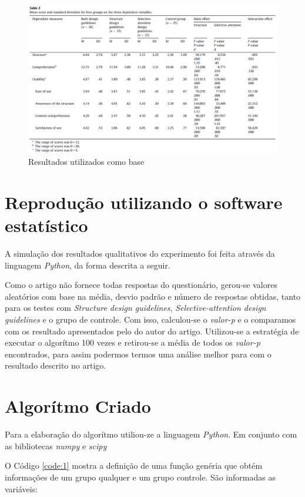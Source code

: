 \documentclass[12pt]{article}
\begin{document}
\begin{figure}[H]
  \centering
  \includegraphics[width=35em]{images/table.png}
  \caption{Resultados utilizados como base}
  \label{fig:img1}
\end{figure}

\section{Reprodução utilizando o software estatístico}

A simulação dos resultados qualitativos do experimento foi feita através da linguagem \textit{Python}, da forma descrita a seguir.

Como o artigo não fornece todas respostas do questionário, gerou-se valores aleatórios com base na média, desvio padrão e número de respostas obtidas, tanto para os testes com \textit{Structure design guidelines}, \textit{Selective-attention design guidelines} e o grupo de controle. Com isso, calculou-se o \textit{valor-p} e o comparamos com os resultado apresentados pelo do autor do artigo. Utilizou-se a estratégia de executar o algorítmo 100 vezes e retirou-se a média de todos os \textit{valor-p} encontrados, para assim podermos termos uma análise melhor para com o resultado descrito no artigo.

\section{Algorítmo Criado}

Para a elaboração do algorítmo utiliou-ze a linguagem \textit{Python}. Em conjunto com as bibliotecas \textit{numpy} e \textit{scipy}

O Código \ref{code:1} mostra a definição de uma função genéria que obtém informações de um grupo qualquer e um grupo controle. São informadas as variáveis:
\end{document}

